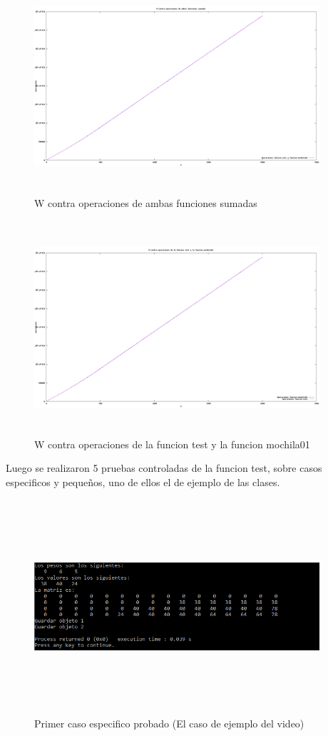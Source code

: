 \documentclass[spanish]{article}
\begin{document}
	\begin{figure}[H]
		\centering
		\includegraphics[width=400px,height=300px]{grafica10}
		\caption{W contra operaciones de ambas funciones sumadas}
	\end{figure}
	\begin{figure}[H]
		\centering
		\includegraphics[width=400px,height=300px]{grafica11}
		\caption{W contra operaciones de la funcion test y la funcion mochila01}
	\end{figure}
	Luego se realizaron 5 pruebas controladas de la funcion test, sobre casos especificos y pequeños, uno de ellos el de ejemplo de las clases.\\
	\begin{figure}[H]
		\centering
		\includegraphics[width=400px,height=300px]{casoEspecifico1}
		\caption{Primer caso especifico probado (El caso de ejemplo del video)}
	\end{figure}
\end{document}
